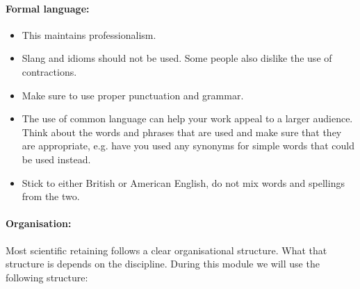 \documentclass[a4paper,12pt]{book}
\begin{document}
\paragraph{Formal language:}
\begin{itemize}
\setlength{\itemsep}{-5pt}
    \item This maintains professionalism.
    \item Slang and idioms should not be used. Some people also dislike the use of contractions.
    \item Make sure to use proper punctuation and grammar.
    \item The use of common language can help your work appeal to a larger audience. Think about the words and phrases that are used and make sure that they are appropriate, e.g. have you used any synonyms for simple words that could be used instead.
    \item Stick to either British or American English, do not mix words and spellings from the two.
\end{itemize}

\paragraph{Organisation:} Most scientific retaining follows a clear organisational structure. What that structure is depends on the discipline. During this module we will use the following structure:
\end{document}
